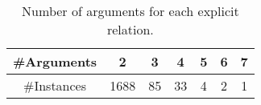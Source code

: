 \begin{table}[!htbp]
\centering
\begin{tabular}{|c|c|c|c|c|c|c|}
\hline

\#Arguments              & 2    & 3   & 4   & 5   & 6  & 7  \\ \hline
\#Instances              & 1688 & 85  & 33  & 4   & 2  & 1  \\ \hline

\end{tabular}
\caption{\label{t:argument-num} Number of arguments for each explicit relation. }
\end{table}
